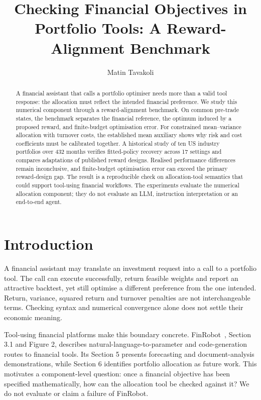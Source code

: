 \documentclass[sigconf,review]{acmart}
\title{Checking Financial Objectives in Portfolio Tools: A Reward-Alignment Benchmark}
\author{Matin Tavakoli}
\affiliation{\institution{Amirkabir University of Technology}\city{Tehran}\country{Iran}}
\begin{document}
\begin{abstract}
A financial assistant that calls a portfolio optimiser needs more than a valid tool response: the allocation must reflect the intended financial preference. We study this numerical component through a reward-alignment benchmark. On common pre-trade states, the benchmark separates the financial reference, the optimum induced by a proposed reward, and finite-budget optimisation error. For constrained mean--variance allocation with turnover costs, the established mean auxiliary shows why risk and cost coefficients must be calibrated together. A historical study of ten US industry portfolios over 432 months verifies fitted-policy recovery across 17 settings and compares adaptations of published reward designs. Realised performance differences remain inconclusive, and finite-budget optimisation error can exceed the primary reward-design gap. The result is a reproducible check on allocation-tool semantics that could support tool-using financial workflows. The experiments evaluate the numerical allocation component; they do not evaluate an LLM, instruction interpretation or an end-to-end agent.
\end{abstract}
\maketitle

\section{Introduction}
A financial assistant may translate an investment request into a call to a portfolio tool. The call can execute successfully, return feasible weights and report an attractive backtest, yet still optimise a different preference from the one intended. Return, variance, squared return and turnover penalties are not interchangeable terms. Checking syntax and numerical convergence alone does not settle their economic meaning.

Tool-using financial platforms make this boundary concrete. FinRobot\ \cite{finrobot2024}, Section 3.1 and Figure 2, describes natural-language-to-parameter and code-generation routes to financial tools. Its Section 5 presents forecasting and document-analysis demonstrations, while Section 6 identifies portfolio allocation as future work. This motivates a component-level question: once a financial objective has been specified mathematically, how can the allocation tool be checked against it? We do not evaluate or claim a failure of FinRobot.
\end{document}
